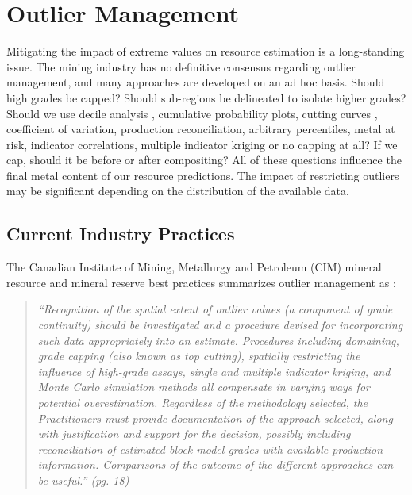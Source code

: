
\chapter{Outlier Management}
\label{ch:predict}

Mitigating the impact of extreme values on resource estimation is a long-standing issue. The mining industry has no definitive consensus regarding outlier management, and many approaches are developed on an ad hoc basis. Should high grades be capped? Should sub-regions be delineated to isolate higher grades? Should we use decile analysis \citep{parrish1997geologist}, cumulative probability plots, cutting curves \citep{roscoe1996cutting}, coefficient of variation, production reconciliation, arbitrary percentiles, metal at risk, indicator correlations, multiple indicator kriging or no capping at all? If we cap, should it be before or after compositing? All of these questions influence the final metal content of our resource predictions. The impact of restricting outliers may be significant depending on the distribution of the available data.

\FloatBarrier
\section{Current Industry Practices}
\label{sec:industry}

The Canadian Institute of Mining, Metallurgy and Petroleum (CIM) mineral resource and mineral reserve best practices summarizes outlier management as \citep{cim2019}:

\blockquote{\textit{``Recognition of the spatial extent of outlier values (a component of grade continuity) should be investigated and a procedure devised for incorporating such data appropriately into an estimate. Procedures including domaining, grade capping (also known as top cutting), spatially restricting the influence of high-grade assays, single and multiple indicator kriging, and Monte Carlo simulation methods all compensate in varying ways for potential overestimation. Regardless of the methodology selected, the Practitioners must provide documentation of the approach selected, along with justification and support for the decision, possibly including reconciliation of estimated block model grades with available production information. Comparisons of the outcome of the different approaches can be useful.'' (pg. 18)}}

